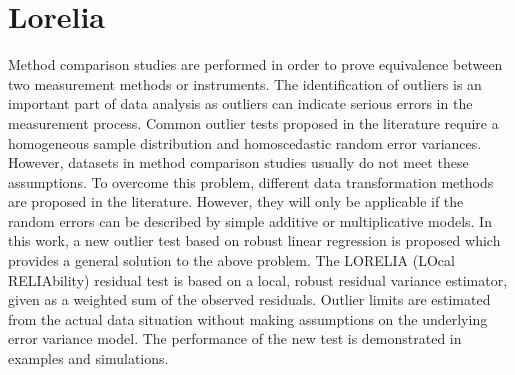 \documentclass[12pt, a4paper]{report}
\theoremstyle{plain}
\theoremstyle{definition}
\theoremstyle{remark}
\begin{document}
\section{Lorelia}


Method comparison studies are performed in order to prove equivalence between two measurement methods or instruments. The identification of outliers is an important part of data analysis as outliers can indicate serious errors in the measurement process. Common outlier tests 
proposed in the literature require a homogeneous sample distribution and homoscedastic random error variances. However, datasets in method comparison studies usually do not meet these assumptions. To overcome this problem, different data transformation methods are proposed in the literature. However, they will only be applicable if the random errors can be described by simple additive or multiplicative models. In this work, a new outlier test based on robust linear regression is proposed which provides a general solution to the above problem. The LORELIA (LOcal RELIAbility) residual test is based on a local, robust residual variance estimator, given as a weighted sum of the observed residuals. Outlier limits are estimated from the actual data situation without making assumptions on the underlying error variance model. The performance of the new test is demonstrated in examples and simulations.
\end{document}
